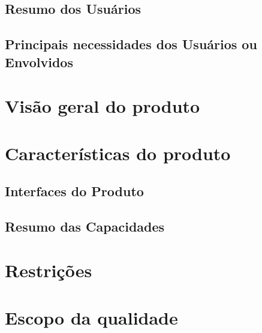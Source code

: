 \begin{appendices}
\subsection{Resumo dos Usuários}

\subsection{Principais necessidades dos Usuários ou Envolvidos}

\section{Visão geral do produto}

\section{Características do produto}

\subsection{Interfaces do Produto}

\subsection{Resumo das Capacidades}

\section{Restrições}

\section{Escopo da qualidade}
\end{appendices}